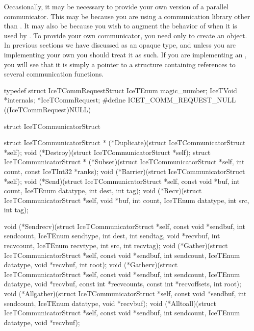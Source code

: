 Occasionally, it may be necessary to provide your own version of a parallel
communicator.  This may be because you are using a communication library
other than \MPI.  It may also be because you wish to augment the behavior
of \MPI when it is used by \IceT.  To provide your own communicator, you
need only to create an  object.  In previous
sections we have discussed  as an opaque type, and
unless you are implementing your own you should treat it as such.  If you
are implementing an , you will see that it is simply
a pointer to a structure containing references to several communication
functions.

\begin{code}
typedef struct IceTCommRequestStruct {
    IceTEnum magic_number;
    IceTVoid *internals;
} *IceTCommRequest;
#define ICET_COMM_REQUEST_NULL ((IceTCommRequest)NULL)

struct IceTCommunicatorStruct {
    struct IceTCommunicatorStruct *
         (*Duplicate)(struct IceTCommunicatorStruct *self);
    void (*Destroy)(struct IceTCommunicatorStruct *self);
    struct IceTCommunicatorStruct *
         (*Subset)(struct IceTCommunicatorStruct *self,
                   int count,
                   const IceTInt32 *ranks);
    void (*Barrier)(struct IceTCommunicatorStruct *self);
    void (*Send)(struct IceTCommunicatorStruct *self,
                 const void *buf,
                 int count,
                 IceTEnum datatype,
                 int dest,
                 int tag);
    void (*Recv)(struct IceTCommunicatorStruct *self,
                 void *buf,
                 int count,
                 IceTEnum datatype,
                 int src,
                 int tag);

    void (*Sendrecv)(struct IceTCommunicatorStruct *self,
                     const void *sendbuf,
                     int sendcount,
                     IceTEnum sendtype,
                     int dest,
                     int sendtag,
                     void *recvbuf,
                     int recvcount,
                     IceTEnum recvtype,
                     int src,
                     int recvtag);
    void (*Gather)(struct IceTCommunicatorStruct *self,
                   const void *sendbuf,
                   int sendcount,
                   IceTEnum datatype,
                   void *recvbuf,
                   int root);
    void (*Gatherv)(struct IceTCommunicatorStruct *self,
                    const void *sendbuf,
                    int sendcount,
                    IceTEnum datatype,
                    void *recvbuf, 
                    const int *recvcounts,
                    const int *recvoffsets,
                    int root);
    void (*Allgather)(struct IceTCommunicatorStruct *self,
                      const void *sendbuf,
                      int sendcount,
                      IceTEnum datatype,
                      void *recvbuf);
    void (*Alltoall)(struct IceTCommunicatorStruct *self,
                     const void *sendbuf,
                     int sendcount,
                     IceTEnum datatype,
                     void *recvbuf);

}
\end{code}

